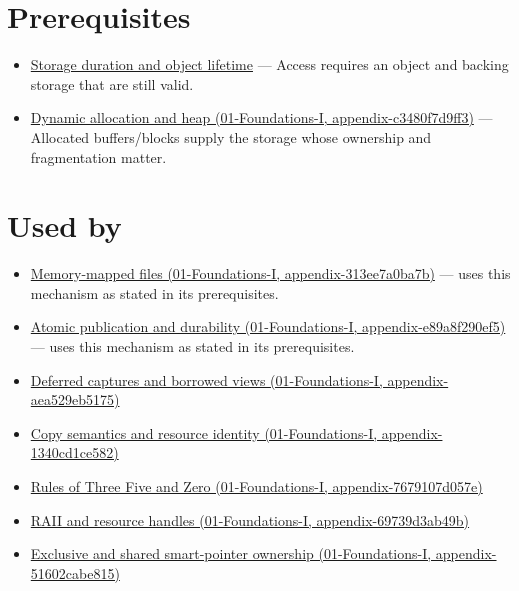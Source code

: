 \section{Prerequisites}\label{appendix-d52e4486f527-prerequisites}

\begin{itemize}
\tightlist
\item
  \hyperref[appendix-0b104bcba06b]{Storage duration and object lifetime} --- Access requires an object and backing storage that are still valid.
\item
  \href{../01-Foundations-I/main.pdf\#nameddest=appendix-c3480f7d9ff3}{Dynamic allocation and heap (01-Foundations-I, appendix-c3480f7d9ff3)} --- Allocated buffers/blocks supply the storage whose ownership and fragmentation matter.
\end{itemize}

\section{Used by}\label{appendix-d52e4486f527-used-by}

\begin{itemize}
\tightlist
\item
  \href{../01-Foundations-I/main.pdf\#nameddest=appendix-313ee7a0ba7b}{Memory-mapped files (01-Foundations-I, appendix-313ee7a0ba7b)} --- uses this mechanism as stated in its prerequisites.
\item
  \href{../01-Foundations-I/main.pdf\#nameddest=appendix-e89a8f290ef5}{Atomic publication and durability (01-Foundations-I, appendix-e89a8f290ef5)} --- uses this mechanism as stated in its prerequisites.
\item
  \href{../01-Foundations-I/main.pdf\#nameddest=appendix-aea529eb5175}{Deferred captures and borrowed views (01-Foundations-I, appendix-aea529eb5175)}
\item
  \href{../01-Foundations-I/main.pdf\#nameddest=appendix-1340cd1ce582}{Copy semantics and resource identity (01-Foundations-I, appendix-1340cd1ce582)}
\item
  \href{../01-Foundations-I/main.pdf\#nameddest=appendix-7679107d057e}{Rules of Three Five and Zero (01-Foundations-I, appendix-7679107d057e)}
\item
  \href{../01-Foundations-I/main.pdf\#nameddest=appendix-69739d3ab49b}{RAII and resource handles (01-Foundations-I, appendix-69739d3ab49b)}
\item
  \href{../01-Foundations-I/main.pdf\#nameddest=appendix-51602cabe815}{Exclusive and shared smart-pointer ownership (01-Foundations-I, appendix-51602cabe815)}
\end{itemize}

